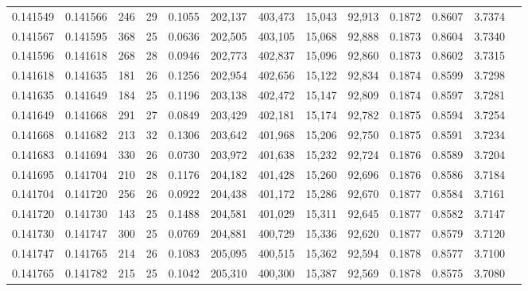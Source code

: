 \begin{tabular}{rrrrrrrrrrrrr}
0.141549 & 0.141566 & 246 &  29 &                                     0.1055 & 202,137 & 403,473 &  15,043 &  92,913 & 0.1872 & 0.8607 & 3.7374 \\
0.141567 & 0.141595 & 368 &  25 &                                     0.0636 & 202,505 & 403,105 &  15,068 &  92,888 & 0.1873 & 0.8604 & 3.7340 \\
0.141596 & 0.141618 & 268 &  28 &                                     0.0946 & 202,773 & 402,837 &  15,096 &  92,860 & 0.1873 & 0.8602 & 3.7315 \\
0.141618 & 0.141635 & 181 &  26 &                                     0.1256 & 202,954 & 402,656 &  15,122 &  92,834 & 0.1874 & 0.8599 & 3.7298 \\
0.141635 & 0.141649 & 184 &  25 &                                     0.1196 & 203,138 & 402,472 &  15,147 &  92,809 & 0.1874 & 0.8597 & 3.7281 \\
0.141649 & 0.141668 & 291 &  27 &                                     0.0849 & 203,429 & 402,181 &  15,174 &  92,782 & 0.1875 & 0.8594 & 3.7254 \\
0.141668 & 0.141682 & 213 &  32 &                                     0.1306 & 203,642 & 401,968 &  15,206 &  92,750 & 0.1875 & 0.8591 & 3.7234 \\
0.141683 & 0.141694 & 330 &  26 &                                     0.0730 & 203,972 & 401,638 &  15,232 &  92,724 & 0.1876 & 0.8589 & 3.7204 \\
0.141695 & 0.141704 & 210 &  28 &                                     0.1176 & 204,182 & 401,428 &  15,260 &  92,696 & 0.1876 & 0.8586 & 3.7184 \\
0.141704 & 0.141720 & 256 &  26 &                                     0.0922 & 204,438 & 401,172 &  15,286 &  92,670 & 0.1877 & 0.8584 & 3.7161 \\
0.141720 & 0.141730 & 143 &  25 &                                     0.1488 & 204,581 & 401,029 &  15,311 &  92,645 & 0.1877 & 0.8582 & 3.7147 \\
0.141730 & 0.141747 & 300 &  25 &                                     0.0769 & 204,881 & 400,729 &  15,336 &  92,620 & 0.1877 & 0.8579 & 3.7120 \\
0.141747 & 0.141765 & 214 &  26 &                                     0.1083 & 205,095 & 400,515 &  15,362 &  92,594 & 0.1878 & 0.8577 & 3.7100 \\
0.141765 & 0.141782 & 215 &  25 &                                     0.1042 & 205,310 & 400,300 &  15,387 &  92,569 & 0.1878 & 0.8575 & 3.7080 \\

\end{tabular}
